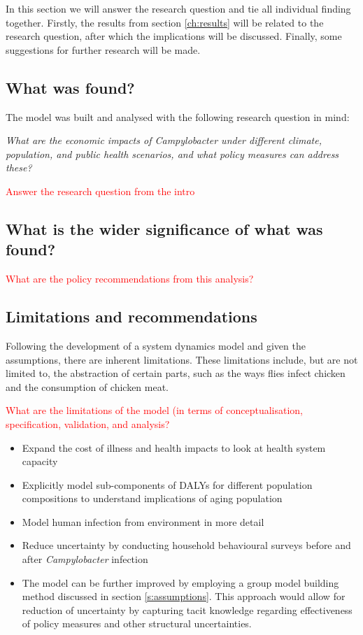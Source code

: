 In this section we will answer the research question and tie all individual finding together. Firstly, the results from section \ref{ch:results} will be related to the research question, after which the implications will be discussed. Finally, some suggestions for further research will be made. 

\subsection{What was found?}

The model was built and analysed with the following research question in mind: 

\begin{center}\textit{\textcolor{NiceBlue}{
What are the economic impacts of Campylobacter under different climate, population, and public health scenarios, and what policy measures can address these? }}
\end{center}


\textcolor{red}{Answer the research question from the intro}


\subsection{What is the wider significance of what was found?}
\textcolor{red}{What are the policy recommendations from this analysis?}


\subsection{Limitations and recommendations}

Following the development of a system dynamics model and given the assumptions, there are inherent limitations. These limitations include, but are not limited to, the abstraction of certain parts, such as the ways flies infect chicken and the consumption of chicken meat. 


\textcolor{red}{What are the limitations of the model (in terms of conceptualisation, specification, validation, and analysis?}
\begin{itemize}
    \item Expand the cost of illness and health impacts to look at health system capacity
    \item Explicitly model sub-components of DALYs for different population compositions to understand implications of aging population
    \item Model human infection from environment in more detail
    \item Reduce uncertainty by conducting household behavioural surveys before and after \textit{Campylobacter} infection
    \item The model can be further improved by employing a group model building method discussed in section \ref{s:assumptions}. This approach would allow for reduction of uncertainty by capturing tacit knowledge regarding effectiveness of policy measures and other structural uncertainties.
\end{itemize}